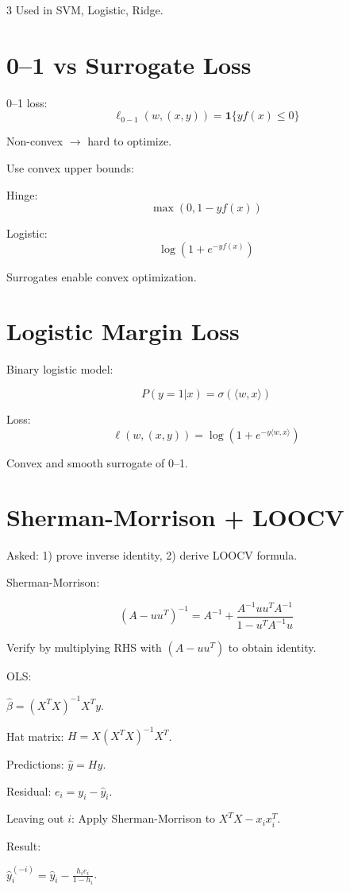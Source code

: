 \documentclass[8pt,fleqn]{extarticle}
\begin{document}
\begin{multicols}{3}
Used in SVM, Logistic, Ridge.


\section*{0--1 vs Surrogate Loss}

0--1 loss:
\[
\ell_{0-1}(w,(x,y))
=
\mathbf 1\{y f(x)\le0\}
\]

Non-convex $\to$ hard to optimize.

Use convex upper bounds:

Hinge:
\[
\max(0,1-yf(x))
\]

Logistic:
\[
\log(1+e^{-y f(x)})
\]

Surrogates enable convex optimization.


\section*{Logistic Margin Loss}

Binary logistic model:

\[
P(y=1|x)=\sigma(\langle w,x\rangle)
\]

Loss:
\[
\ell(w,(x,y))
=
\log(1+e^{-y\langle w,x\rangle})
\]

Convex and smooth surrogate of 0--1.


\section*{Sherman-Morrison + LOOCV}

Asked:
1) prove inverse identity,
2) derive LOOCV formula.

Sherman-Morrison:

\[
(A-uu^T)^{-1}
=
A^{-1}
+
\frac{A^{-1}uu^TA^{-1}}
{1-u^TA^{-1}u}
\]

Verify by multiplying RHS with $(A-uu^T)$ to obtain identity.

OLS:

$\hat\beta=(X^TX)^{-1}X^Ty$.

Hat matrix:
$H=X(X^TX)^{-1}X^T$.

Predictions:
$\hat y=Hy$.

Residual:
$e_i=y_i-\hat y_i$.

Leaving out $i$:
Apply Sherman-Morrison to
$X^TX-x_ix_i^T$.

Result:

$\hat y_i^{(-i)}
=
\hat y_i
-
\frac{h_i e_i}{1-h_i}$.


\end{multicols}
\end{document}

